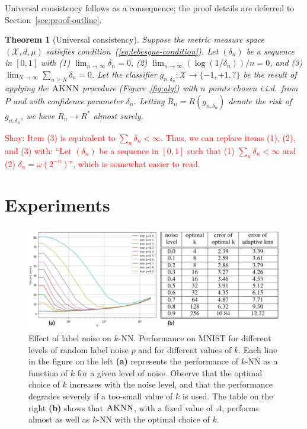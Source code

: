 \documentclass{article}
\def\X{{\mathcal X}}
\newcommand{\algname}{\textsc{AKNN}}
\newtheorem{theorem}{Theorem}
\begin{document}
Universal consistency follows as a consequence; the proof details are deferred to Section~\ref{sec:proof-outline}.
\begin{theorem}[Universal consistency]
Suppose the metric measure space $(\X, d, \mu)$ satisfies condition~(\ref{eq:lebesgue-condition}). Let $(\delta_n)$ be a sequence in $[0,1]$ with (1) $\lim_{n \rightarrow \infty} \delta_n = 0$, (2) $\lim_{n \rightarrow \infty} (\log (1/\delta_n))/n = 0$, and (3) $\lim_{N \rightarrow \infty} \sum_{n \geq N} \delta_n = 0$. Let the classifier $g_{n, \delta_n}: \X \rightarrow \{-1,+1,?\}$ be the result of applying the $\algname$ procedure (Figure~\ref{fig:alg}) with $n$ points chosen i.i.d.\ from $P$ and with confidence parameter $\delta_n$. Letting $R_n = R(g_{n,\delta_n})$ denote the risk of $g_{n,\delta_n}$, we have $R_n \rightarrow R^*$ almost surely.
\label{thm:universal-consistency}
\end{theorem}
\textcolor{red}{Shay: Item (3) is equivalent to $\sum_n \delta_n < \infty$.
Thus, we can replace items (1), (2), and (3) with: 
``Let $(\delta_n)$ be a sequence in $[0,1]$ such that (1) $\sum_n \delta_n < \infty$ and (2) $\delta_n = \omega(2^{-n})$'', which is somewhat easier to read.}




\section{Experiments}

\begin{figure}[t]
\begin{center}
\includegraphics[width=0.9\linewidth, height=1.8in]{figs/combined_figure.png}
\end{center}
\caption{%
  Effect of label noise on $k$-NN.
  Performance on MNIST for different levels of random label noise $p$
  and for different values of $k$. Each line in the figure on the left {\bf (a)}
  represents the performance of $k$-NN as a function of $k$ for a
  given level of noise. Observe that the optimal choice of $k$
  increases with the noise level, and that the performance degrades
  severely if a too-small value of $k$ is used. The table on the right {\bf (b)}
  shows that $\algname$, with a fixed value of $A$, performs almost as well
  as $k$-NN with the optimal choice of $k$.}
\label{fig:mnist}
\end{figure}
\end{document}
